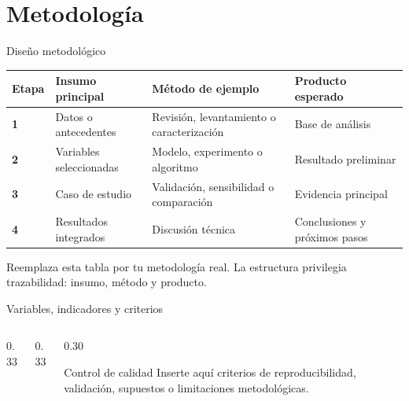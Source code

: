 \section{Metodología}

\begin{frame}{Diseño metodológico}
  \begin{table}
  \fontsize{7.9}{9.2}\selectfont
  \begin{tabularx}{\textwidth}{>{\bfseries}l X X X}
    \toprule
    Etapa & Insumo principal & Método de ejemplo & Producto esperado \\
    \midrule
    1 & Datos o antecedentes & Revisión, levantamiento o caracterización & Base de análisis \\
    2 & Variables seleccionadas & Modelo, experimento o algoritmo & Resultado preliminar \\
    3 & Caso de estudio & Validación, sensibilidad o comparación & Evidencia principal \\
    4 & Resultados integrados & Discusión técnica & Conclusiones y próximos pasos \\
    \bottomrule
  \end{tabularx}
  \end{table}
  \begin{UCKeyPoint}
    Reemplaza esta tabla por tu metodología real. La estructura privilegia trazabilidad: insumo, método y producto.
  \end{UCKeyPoint}
\end{frame}

\begin{frame}{Variables, indicadores y criterios}
  \begin{columns}[T,onlytextwidth]
    \begin{column}{0.33\textwidth}
    \end{column}
    \begin{column}{0.33\textwidth}
    \end{column}
    \begin{column}{0.30\textwidth}
      \begin{UCBlock}{Control de calidad}
        Inserte aquí criterios de reproducibilidad, validación, supuestos o limitaciones metodológicas.
      \end{UCBlock}
    \end{column}
  \end{columns}
\end{frame}


